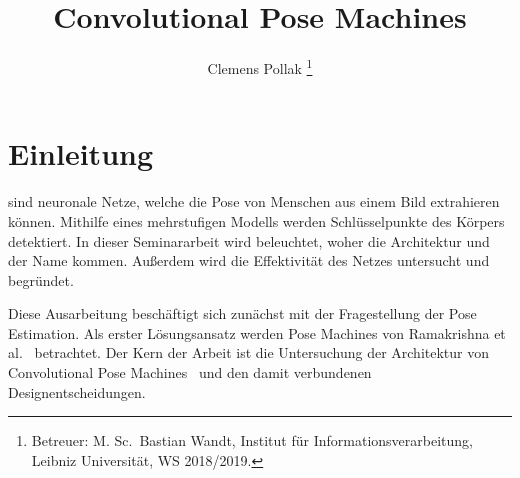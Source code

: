 \documentclass[journal, a4paper]{IEEEtran}
\begin{document}
	\title{Convolutional Pose Machines}
	\author{Clemens Pollak
	\thanks{Betreuer: M. Sc.~Bastian Wandt, Institut f\"ur Informations­verarbeitung, Leibniz Universit\"at, WS 2018/2019.}}
	\maketitle

\section{Einleitung}
	 sind neuronale Netze, welche die Pose von Menschen aus einem Bild extrahieren können. Mithilfe eines mehrstufigen Modells werden Schlüsselpunkte des Körpers detektiert. In dieser Seminararbeit wird beleuchtet, woher die Architektur und der Name kommen. Außerdem wird die Effektivität des Netzes untersucht und begründet.

        Diese Ausarbeitung beschäftigt sich zunächst mit der Fragestellung der Pose Estimation. Als erster Lösungsansatz werden Pose Machines von Ramakrishna et al.~\cite{ramakrishna2014pose} betrachtet. Der Kern der Arbeit ist die Untersuchung der Architektur von Convolutional Pose Machines~\cite{conv_pose} und den damit verbundenen Designentscheidungen.
\end{document}
